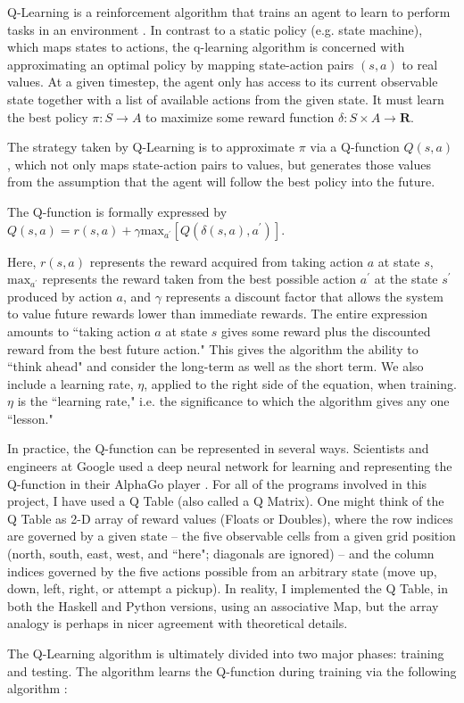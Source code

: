 \documentclass[12pt,a4paper]{article}
\begin{document}
		\par Q-Learning is a reinforcement algorithm that trains an agent to learn to perform tasks in an environment \cite{RL}. In contrast to a static policy (e.g. state machine), which maps states to actions, the q-learning algorithm is concerned with approximating an optimal policy by mapping state-action pairs $(s, a)$ to real values. At a given timestep, the agent only has access to its current observable state together with a list of available actions from the given state. It must learn the best policy $\pi : S \rightarrow A$ to maximize some reward function $\delta : S \times A \rightarrow \mathbf{R}$.
		\par The strategy taken by Q-Learning is to approximate $\pi$ via a Q-function $Q(s,a)$, which not only maps state-action pairs to values, but generates those values from the assumption that the agent will follow the best policy into the future.
		\par The Q-function is formally expressed by $Q(s,a) = r(s,a) + \gamma \text{max}_{a^\prime} [Q(\delta(s,a), a^\prime)]$.
		\par Here, $r(s,a)$ represents the reward acquired from taking action $a$ at state $s$, $\text{max}_{a^\prime}$ represents the reward taken from the best possible action $a^\prime$ at the state $s^\prime$ produced by action $a$, and $\gamma$ represents a discount factor that allows the system to value future rewards lower than immediate rewards. The entire expression amounts to ``taking action $a$ at state $s$ gives some reward plus the discounted reward from the best future action." This gives the algorithm the ability to ``think ahead" and consider the long-term as well as the short term. We also include a learning rate, $\eta$, applied to the right side of the equation, when training. $\eta$ is the ``learning rate," i.e. the significance to which the algorithm gives any one ``lesson."
		\par In practice, the Q-function can be represented in several ways. Scientists and engineers at Google used a deep neural network for learning and representing the Q-function in their AlphaGo player \cite{alphago}. For all of the programs involved in this project, I have used a Q Table (also called a Q Matrix). One might think of the Q Table as 2-D array of reward values (Floats or Doubles), where the row indices are governed by a given state -- the five observable cells from a given grid position (north, south, east, west, and ``here"; diagonals are ignored) -- and the column indices governed by the five actions possible from an arbitrary state (move up, down, left, right, or attempt a pickup). In reality, I implemented the Q Table, in both the Haskell and Python versions, using an associative Map, but the array analogy is perhaps in nicer agreement with theoretical details.
		\par The Q-Learning algorithm is ultimately divided into two major phases: training and testing. The algorithm learns the Q-function during training via the following algorithm \cite{RL}:
		
\end{document}
